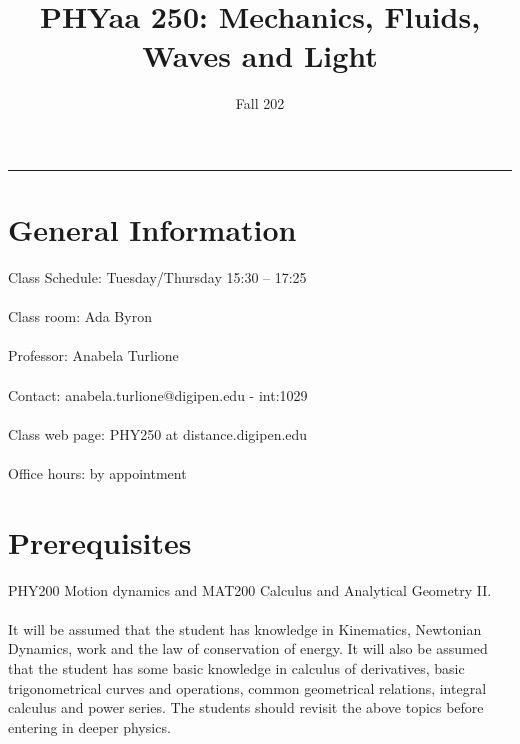 \documentclass[12pt]{article}
\title{PHYaa 250: Mechanics, Fluids, Waves and Light}
\author{Fall 202}
\date{}
\newcommand{\blankline}{\quad\pagebreak[2]}
\begin{document}
\maketitle









\hrule



\section*{General Information }

Class Schedule: Tuesday/Thursday 15:30 – 17:25 \\ 
\\
Class room: Ada Byron\\
\\
Professor: Anabela Turlione\\
\\
Contact: anabela.turlione@digipen.edu - int:1029\\
\\
Class web page: PHY250 at distance.digipen.edu\\
\\
Office hours: by appointment\\

\section*{Prerequisites }
 PHY200 Motion dynamics and MAT200 Calculus and Analytical Geometry II.\\
\\
It will be assumed that the student has knowledge in Kinematics, Newtonian Dynamics, work and the law of conservation of 
energy.	
It will also be assumed that the student has some basic knowledge in calculus of derivatives, 
basic trigonometrical curves and operations, common geometrical relations, integral calculus and power series. 
The students should revisit the above topics before entering in deeper physics.
\end{document}
